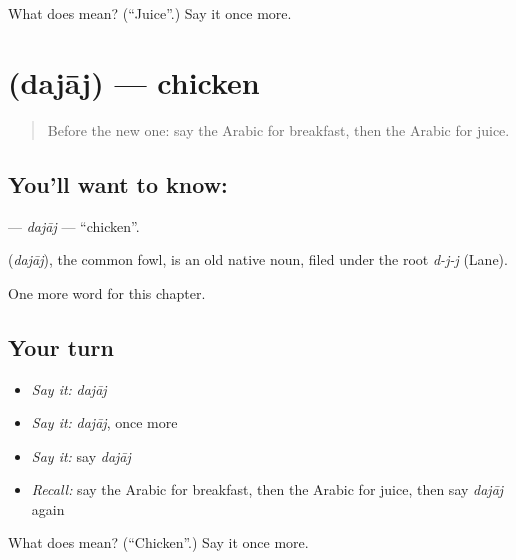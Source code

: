 \begin{tcolorbox}[breakable,colback=teal!4,colframe=teal!35!black,title={Before you move on}]
What does  mean? (\textquotedblleft{}Juice\textquotedblright{}.) Say it once more.
\end{tcolorbox}
\section[\texorpdfstring{\ar{دجاج} (dajāj)}{دجاج (dajāj)}]{ (dajāj) — chicken}

\label{lesson:AR-C69-dajaj}



\begin{quote}
Before the new one: say the Arabic for breakfast, then the Arabic for juice.
\end{quote}

\subsection*{You'll want to know: }
\textbf{} — \emph{dajāj} — \textquotedblleft{}chicken\textquotedblright{}.

\begin{cousinweb}
\textbf{} (\emph{dajāj}), the common fowl, is an old native noun, filed under the root \emph{d-j-j} (Lane).
\end{cousinweb}

\begin{grammarlens}[title={What you've built}]
One more word for this chapter.
\end{grammarlens}

\subsection*{Your turn}
\begin{itemize}
\raggedright
  \item \emph{Say it:} \emph{dajāj}
  \item \emph{Say it:} \emph{dajāj}, once more
  \item \emph{Say it:} say \emph{dajāj}
  \item \emph{Recall:} say the Arabic for breakfast, then the Arabic for juice, then say \emph{dajāj} again
\end{itemize}

\begin{tcolorbox}[breakable,colback=teal!4,colframe=teal!35!black,title={Before you move on}]
What does  mean? (\textquotedblleft{}Chicken\textquotedblright{}.) Say it once more.
\end{tcolorbox}
